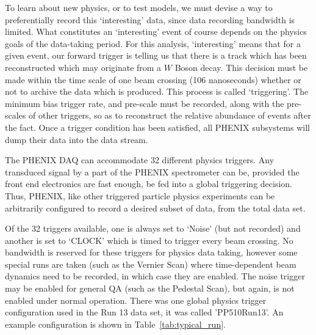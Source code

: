 To learn about new physics, or to test models, we must devise a way to
preferentially record this `interesting'  data, since data recording bandwidth
is limited. What constitutes an `interesting' event of course depends on the
physics goals of the data-taking period. For this analysis, `interesting' means
that for a given event, our forward trigger is telling us that there is a track
which has been reconstructed which may originate from a $W$ Boson decay. This
decision must be made within the time scale of one beam crossing (106
nanoseconds) whether or not to archive the data which is produced. This process
is called `triggering'. The minimum bias trigger rate, and pre-scale must be
recorded, along with the pre-scales of other triggers, so as to reconstruct the
relative abundance of events after the fact.  Once a trigger condition has been
satisfied, all PHENIX subsystems will dump their data into the data stream.

The PHENIX DAQ can accommodate 32 different physics triggers. Any transduced
signal by a part of the PHENIX spectrometer can be, provided the front end
electronics are fast enough, be fed into a global triggering decision. Thus,
PHENIX, like other triggered particle physics experiments can be arbitrarily
configured to record a desired subset of data, from the total data set.

Of the 32 triggers available, one is always set to `Noise' (but not recorded)
and another is set to `CLOCK' which is timed to trigger every beam crossing. No
bandwidth is reserved for these triggers for physics data taking, however some
special runs are taken (such as the Vernier Scan) where time-dependent beam
dynamics need to be recorded, in which case they are enabled. The noise trigger
may be enabled for general QA (such as the Pedestal Scan), but again, is not
enabled under normal operation.  There was one global physics trigger
configuration used in the Run 13 data set, it was called 'PP510Run13'. An
example configuration is shown in Table~\ref{tab:typical_run}.

